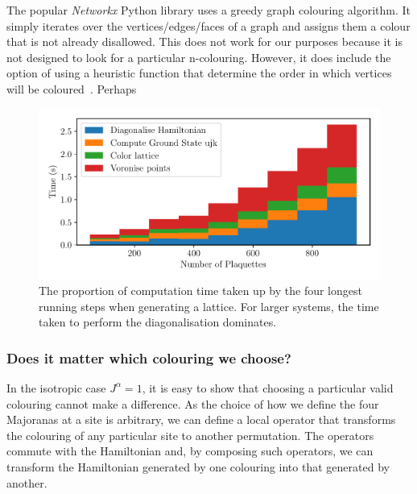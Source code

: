 The popular \emph{Networkx} Python library uses a greedy graph colouring algorithm. It simply iterates over the vertices/edges/faces of a graph and assigns them a colour that is not already disallowed. This does not work for our purposes because it is not designed to look for a particular n-colouring. However, it does include the option of using a heuristic function that determine the order in which vertices will be coloured~\autocite{kosowski2004classical,matulaSmallestlastOrderingClustering1983}. Perhaps

\hypertarget{fig:times}{%
\begin{figure}
\centering
\includegraphics[width=1\textwidth,height=\textheight]{figure_code/amk_chapter/methods/times/times}
\caption[{Computation Time Spent on Different Procedures.}]{The proportion of computation time taken up by the four longest running steps when generating a lattice. For larger systems, the time taken to perform the diagonalisation dominates.}
\label{fig:times}
\end{figure}
}

\hypertarget{does-it-matter-which-colouring-we-choose}{%
\subsubsection{Does it matter which colouring we choose?}\label{does-it-matter-which-colouring-we-choose}}

In the isotropic case \(J^\alpha = 1\), it is easy to show that choosing a particular valid colouring cannot make a difference. As the choice of how we define the four Majoranas at a site is arbitrary, we can define a local operator that transforms the colouring of any particular site to another permutation. The operators commute with the Hamiltonian and, by composing such operators, we can transform the Hamiltonian generated by one colouring into that generated by another.

